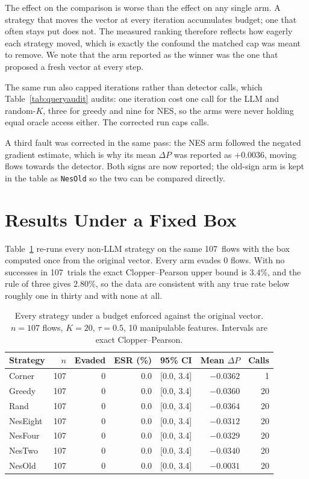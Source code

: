 \documentclass[journal]{IEEEtran}
\theoremstyle{definition}
\newcommand{\NESdp}{+0.0036}
\newcommand{\CN}{107}
\newcommand{\CBudget}{20}
\newcommand{\CTau}{0.5}
\newcommand{\CNfeat}{10}
\newcommand{\CCPhi}{3.4}
\newcommand{\CRuleThree}{2.80}
\newcommand{\CGreedyEv}{0}
\begin{document}
The effect on the comparison is worse than the effect on any single arm. A
strategy that moves the vector at every iteration accumulates budget; one that
often stays put does not. The measured ranking therefore reflects how eagerly
each strategy moved, which is exactly the confound the matched cap was meant to
remove. We note that the arm reported as the winner was the one that proposed a
fresh vector at every step.

The same run also capped iterations rather than detector calls, which
Table~\ref{tab:queryaudit} audits: one iteration cost one call for the LLM and
random-$K$, three for greedy and nine for NES, so the arms were never holding
equal oracle access either. The corrected run caps calls.

A third fault was corrected in the same pass: the NES arm followed the negated
gradient estimate, which is why its mean $\Delta P$ was reported as $\NESdp$,
moving flows towards the detector. Both signs are now reported; the old-sign arm
is kept in the table as \texttt{NesOld} so the two can be compared directly.

\section{Results Under a Fixed Box}
\label{sec:corrected}

Table~\ref{tab:corrected} re-runs every non-LLM strategy on the same \CN\ flows
with the box computed once from the original vector. Every arm evades
$\CGreedyEv$ flows. With no successes in \CN\ trials the exact
Clopper--Pearson upper bound is $\CCPhi$\%, and the rule of three gives
$\CRuleThree$\%, so the data are consistent with any true rate below roughly one
in thirty and with none at all.

\begin{table}[t]
\caption{Every strategy under a budget enforced against the original vector.
$n=\CN$ flows, $K=\CBudget$, $\tau=\CTau$, \CNfeat{} manipulable features.
Intervals are exact Clopper--Pearson.}
\label{tab:corrected}
\centering
\footnotesize
\setlength{\tabcolsep}{4pt}
\begin{tabular}{lrrrlrr}
\toprule
Strategy & $n$ & Evaded & ESR (\%) & 95\% CI & Mean $\Delta P$ & Calls \\
\midrule
Corner & 107 & 0 & 0.0 & [0.0, 3.4] & $-0.0362$ & 1 \\
Greedy & 107 & 0 & 0.0 & [0.0, 3.4] & $-0.0360$ & 20 \\
Rand & 107 & 0 & 0.0 & [0.0, 3.4] & $-0.0364$ & 20 \\
NesEight & 107 & 0 & 0.0 & [0.0, 3.4] & $-0.0312$ & 20 \\
NesFour & 107 & 0 & 0.0 & [0.0, 3.4] & $-0.0329$ & 20 \\
NesTwo & 107 & 0 & 0.0 & [0.0, 3.4] & $-0.0340$ & 20 \\
NesOld & 107 & 0 & 0.0 & [0.0, 3.4] & $-0.0031$ & 20 \\
\bottomrule
\end{tabular}
\end{table}
\end{document}
